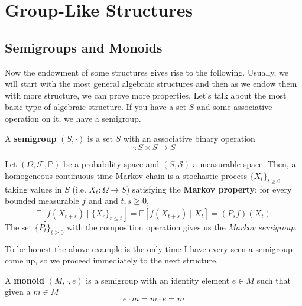 \section{Group-Like Structures} 

\subsection{Semigroups and Monoids}

  Now the endowment of some structures gives rise to the following. Usually, we will start with the most general algebraic structures and then as we endow them with more structure, we can prove more properties. Let's talk about the most basic type of algebraic structure. If you have a set $S$ and some associative operation on it, we have a semigroup. 

  \begin{definition}[Semigroup]
    A \textbf{semigroup} $(S, \cdot)$ is a set $S$ with an associative binary operation 
    \begin{equation}
      \cdot : S \times S \to S
    \end{equation}
  \end{definition} 

  \begin{example}
    Let $(\Omega, \mathcal{F}, \mathbb{P})$ be a probability space and $(S, \mathcal{S})$ a measurable space. Then, a homogeneous continuous-time Markov chain is a stochastic process $\{X_t\}_{t \geq 0}$ taking values in $S$ (i.e. $X_t: \Omega \rightarrow S$) satisfying the \textbf{Markov property}: for every bounded measurable $f$ and and $t, s \geq 0$, 
    \begin{equation}
      \mathbb{E}[ f(X_{t + s}) \mid \{X_r\}_{r \leq t} ] = \mathbb{E}[ f(X_{t + s}) \mid X_t ] = (P_s f)(X_t)
    \end{equation}
    The set $\{P_t\}_{t \geq 0}$ with the composition operation gives us the \textit{Markov semigroup}. 
  \end{example} 

  To be honest the above example is the only time I have every seen a semigroup come up, so we proceed immediately to the next structure. 

  \begin{definition}[Monoid]
    A \textbf{monoid} $(M, \cdot, e)$ is a semigroup with an identity element $e \in M$ such that given a $m \in M$
    \begin{equation}
      e \cdot m = m \cdot e = m
    \end{equation}
  \end{definition} 

